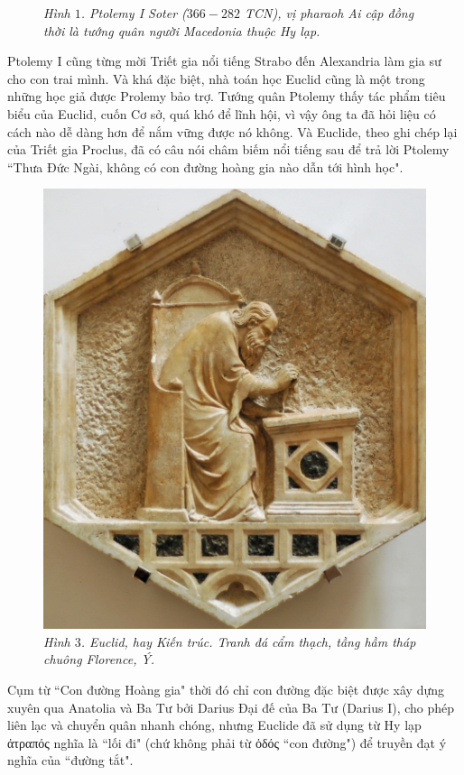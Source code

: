 \begin{multicols}{2}
\begin{figure}[H]
		\caption{\small\textit{\color{quantoan}Hình $1$. Ptolemy I Soter ($366-282$ TCN), vị pharaoh Ai cập đồng thời là tướng quân người Macedonia thuộc Hy lạp.}}
		\vspace*{-10pt}
	\end{figure}
	Ptolemy I cũng  từng mời Triết gia nổi tiếng Strabo đến Alexandria làm gia sư cho con trai mình. Và khá đặc biệt, nhà toán học Euclid cũng là một trong những học giả được Prolemy bảo trợ. Tướng quân Ptolemy thấy tác phẩm tiêu biểu của Euclid, cuốn Cơ sở, quá khó để lĩnh hội, vì vậy ông ta  đã hỏi liệu có cách nào dễ dàng hơn để nắm vững được nó không. Và Euclide, theo ghi chép lại của Triết gia Proclus, đã có câu nói châm biếm nổi tiếng sau để trả lời Ptolemy ``Thưa Đức Ngài, không có con đường hoàng gia nào dẫn tới hình học".
	\begin{figure}[H]
		\vspace*{-5pt}
		\centering
		\captionsetup{labelformat= empty, justification=centering}
		\includegraphics[width= 0.6\linewidth]{4}
		\caption{\small\textit{\color{quantoan}Hình $3$. Euclid, hay Kiến trúc. Tranh đá cẩm thạch, tầng hầm tháp chuông Florence, Ý.}}
		\vspace*{-10pt}
	\end{figure}
	Cụm từ ``Con đường Hoàng gia" thời đó chỉ  con đường đặc biệt được xây dựng xuyên qua Anatolia và Ba Tư bởi Darius Đại đế của Ba Tư (Darius I), cho phép liên lạc và chuyển quân nhanh chóng, nhưng Euclide đã sử dụng từ Hy lạp  ἀτραπός nghĩa là ``lối đi" (chứ không phải từ ὁδός ``con đường")  để truyền đạt ý nghĩa của ``đường tắt".
	\begin{figure}[H]
		\vspace*{-5pt}
		\centering

\end{figure}
\end{multicols}
